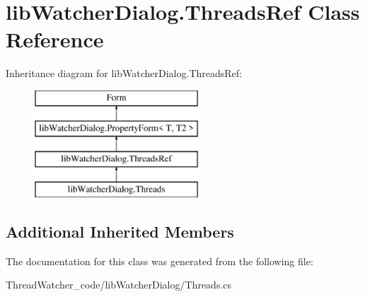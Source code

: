 \hypertarget{classlib_watcher_dialog_1_1_threads_ref}{\section{lib\+Watcher\+Dialog.\+Threads\+Ref Class Reference}
\label{classlib_watcher_dialog_1_1_threads_ref}
}
Inheritance diagram for lib\+Watcher\+Dialog.\+Threads\+Ref\+:\begin{figure}[H]
\begin{center}
\leavevmode
\includegraphics[height=4.000000cm]{classlib_watcher_dialog_1_1_threads_ref}
\end{center}
\end{figure}
\subsection*{Additional Inherited Members}


The documentation for this class was generated from the following file\+:\begin{DoxyCompactItemize}
\item 
Thread\+Watcher\+\_\+code/lib\+Watcher\+Dialog/Threads.\+cs\end{DoxyCompactItemize}
